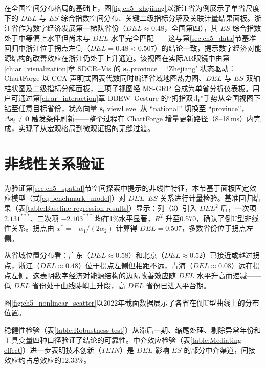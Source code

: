 在全国空间分布格局的基础上，图\ref{fig:ch5_zhejiang}以浙江省为例展示了单省尺度下的 $DEL$ 与 $ES$ 综合指数空间分布、关键二级指标分解及关联计量结果面板。浙江省作为数字经济发展第一梯队省份（$DEL\approx0.48$，全国第四），其 $ES$ 综合指数处于中等偏上水平但尚未与 $DEL$ 水平完全匹配——这与第\ref{sec:ch5_data}节基准回归中浙江位于拐点左侧（$DEL=0.48<0.507$）的结论一致，提示数字经济对能源结构的改善效应在浙江仍处于上升通道。该视图在实际AR眼镜中由第\ref{ch:ar_visualization}章 SDCR--Vis 的 $\mathbf{s}_t.\mathrm{province}=\text{`Zhejiang'}$ 状态驱动：ChartForge 以 CCA 声明式图表代数同时编译省域地图热力图、$DEL$ 与 $ES$ 双轴柱状图及二级指标分解面板，三项子视图经 MS-GRP 合成为单省分析仪表板。用户可通过第\ref{ch:ar_interaction}章 DBEW--Gesture 的``拇指双击''手势从全国视图下钻至任意目标省份，状态向量 $\mathbf{s}_t.\mathrm{viewLevel}$ 从 ``national'' 切换至 ``province''，$\Delta\mathbf{s}_t\neq\mathbf{0}$ 触发条件刷新——整个过程在 ChartForge 增量更新路径（8--18\,ms）内完成，实现了从宏观格局到微观证据的无缝过渡。

\section{非线性关系验证}
\label{sec:ch5_nonlinear}

为验证第\ref{sec:ch5_spatial}节空间探索中提示的非线性特征，本节基于面板固定效应模型（式\ref{eq:benchmark_model}）对 $DEL$--$ES$ 关系进行计量检验。基准回归结果（表\ref{table:Baseline regression results}）显示：列（3）引入 $DEL^2$ 后，一次项 $2.131^{***}$、二次项 $-2.103^{***}$ 均在1\%水平显著，$R^2$ 升至0.570，确认了倒U型非线性关系。拐点由 $x^* = -\alpha_1/(2\alpha_2)$ 计算得 $DEL=0.507$，多数省份位于拐点左侧。

从省域位置分布看：广东（$DEL\approx0.58$）和北京（$DEL\approx0.52$）已接近或越过拐点，浙江（$DEL\approx0.48$）位于拐点左侧但相距不远，青海（$DEL\approx0.08$）远在拐点左侧。这表明数字经济对能源结构的边际改善效应随 $DEL$ 水平升高而递减——低 $DEL$ 省份处于曲线陡峭上升段，高 $DEL$ 省份已进入平台期。

图\ref{fig:ch5_nonlinear_scatter}以2022年截面数据展示了各省在倒U型曲线上的分布位置。

稳健性检验（表\ref{table:Robustness test}）从滞后一期、缩尾处理、剔除异常年份和工具变量四种口径验证了结论的可靠性。中介效应检验（表\ref{table:Mediating effect}）进一步表明技术创新（$TEIN$）是 $DEL$ 影响 $ES$ 的部分中介渠道，间接效应约占总效应的12.33\%。

